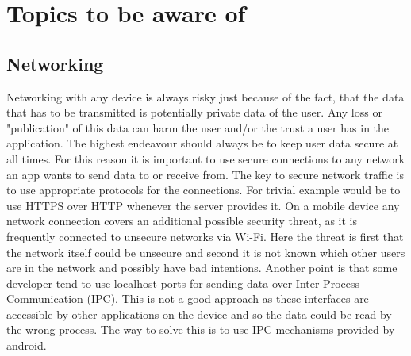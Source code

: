 \chapter{Topics to be aware of}
\label{chp:howto}

\section{Networking}
\label{chp:howto:sec:networking}

Networking with any device is always risky just because of the fact, that the data that has to be transmitted is potentially private data of the user. Any loss or "publication" of this data can harm the user and/or the trust a user has in the application. The highest endeavour should always be to keep user data secure at all times. For this reason it is important to use secure connections to any network an app wants to send data to or receive from. 
The key to secure network traffic is to use appropriate protocols for the connections. For trivial example would be to use HTTPS over HTTP whenever the server provides it.
On a mobile device any network connection covers an additional possible security threat, as it is frequently connected to unsecure networks via Wi-Fi. Here the threat is first that the network itself could be unsecure and second it is not known which other users are in the network and possibly have bad intentions.
Another point is that some developer tend to use localhost ports for sending data over Inter Process Communication (IPC). This is not a good approach as these interfaces are accessible by other applications on the device and so the data could be read by the wrong process. The way to solve this is to use IPC mechanisms provided by android.